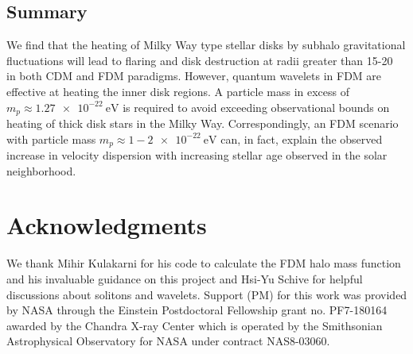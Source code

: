 \documentclass[usenatbib]{mnras}
\begin{document}
\subsection{Summary}
We find that the heating of Milky Way type stellar disks by subhalo gravitational fluctuations will lead to flaring and disk destruction at radii greater than 15-\SI{20}{\kilo\parsec} in both CDM and FDM paradigms. However, quantum wavelets in FDM are effective at heating the inner disk regions. A particle mass in excess of $m_p \approx \SI{1.27 e-22}{\electronvolt}$ is required to avoid exceeding observational bounds on heating of thick disk stars in the Milky Way. Correspondingly, an FDM scenario with particle mass $m_p \approx 1-\SI{2e-22}{\electronvolt}$ can, in fact, explain the observed increase in velocity dispersion with increasing stellar age observed in the solar neighborhood.    


\section*{Acknowledgments}
We thank Mihir Kulakarni for his code to calculate the FDM halo mass function and his invaluable guidance on this project and Hsi-Yu Schive for helpful discussions about solitons and wavelets. Support (PM) for this work was provided by NASA through the Einstein Postdoctoral Fellowship grant no. PF7-180164 awarded by the Chandra X-ray Center which is operated by the Smithsonian Astrophysical Observatory for NASA under contract NAS8-03060. 




 
\end{document}

